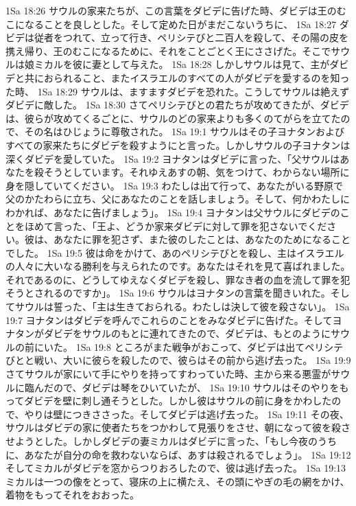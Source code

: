 1Sa 18:26  サウルの家来たちが、この言葉をダビデに告げた時、ダビデは王のむこになることを良しとした。そして定めた日がまだこないうちに、
1Sa 18:27  ダビデは従者をつれて、立って行き、ペリシテびと二百人を殺して、その陽の皮を携え帰り、王のむこになるために、それをことごとく王にささげた。そこでサウルは娘ミカルを彼に妻として与えた。
1Sa 18:28  しかしサウルは見て、主がダビデと共におられること、またイスラエルのすべての人がダビデを愛するのを知った時、
1Sa 18:29  サウルは、ますますダビデを恐れた。こうしてサウルは絶えずダビデに敵した。
1Sa 18:30  さてペリシテびとの君たちが攻めてきたが、ダビデは、彼らが攻めてくるごとに、サウルのどの家来よりも多くのてがらを立てたので、その名はひじょうに尊敬された。
1Sa 19:1  サウルはその子ヨナタンおよびすべての家来たちにダビデを殺すようにと言った。しかしサウルの子ヨナタンは深くダビデを愛していた。
1Sa 19:2  ヨナタンはダビデに言った、「父サウルはあなたを殺そうとしています。それゆえあすの朝、気をつけて、わからない場所に身を隠していてください。
1Sa 19:3  わたしは出て行って、あなたがいる野原で父のかたわらに立ち、父にあなたのことを話しましょう。そして、何かわたしにわかれば、あなたに告げましょう」。
1Sa 19:4  ヨナタンは父サウルにダビデのことをほめて言った、「王よ、どうか家来ダビデに対して罪を犯さないでください。彼は、あなたに罪を犯さず、また彼のしたことは、あなたのためになることでした。
1Sa 19:5  彼は命をかけて、あのペリシテびとを殺し、主はイスラエルの人々に大いなる勝利を与えられたのです。あなたはそれを見て喜ばれました。それであるのに、どうしてゆえなくダビデを殺し、罪なき者の血を流して罪を犯そうとされるのですか」。
1Sa 19:6  サウルはヨナタンの言葉を聞きいれた。そしてサウルは誓った、「主は生きておられる。わたしは決して彼を殺さない」。
1Sa 19:7  ヨナタンはダビデを呼んでこれらのことをみなダビデに告げた。そしてヨナタンがダビデをサウルのもとに連れてきたので、ダビデは、もとのようにサウルの前にいた。
1Sa 19:8  ところがまた戦争がおこって、ダビデは出てペリシテびとと戦い、大いに彼らを殺したので、彼らはその前から逃げ去った。
1Sa 19:9  さてサウルが家にいて手にやりを持ってすわっていた時、主から来る悪霊がサウルに臨んだので、ダビデは琴をひいていたが、
1Sa 19:10  サウルはそのやりをもってダビデを壁に刺し通そうとした。しかし彼はサウルの前に身をかわしたので、やりは壁につきささった。そしてダビデは逃げ去った。
1Sa 19:11  その夜、サウルはダビデの家に使者たちをつかわして見張りをさせ、朝になって彼を殺させようとした。しかしダビデの妻ミカルはダビデに言った、「もし今夜のうちに、あなたが自分の命を救わないならば、あすは殺されるでしょう」。
1Sa 19:12  そしてミカルがダビデを窓からつりおろしたので、彼は逃げ去った。
1Sa 19:13  ミカルは一つの像をとって、寝床の上に横たえ、その頭にやぎの毛の網をかけ、着物をもってそれをおおった。
